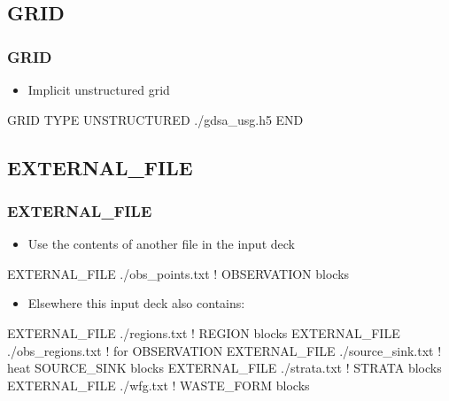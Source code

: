 \documentclass{beamer}
\newcommand\redcomment[1]{{{\color{red} #1}}}
\newcommand\bluecomment[1]{{{\color{blue} #1}}}
\begin{document}
\subsection{GRID}

\begin{frame}[fragile]\frametitle{GRID}

\begin{itemize}
  \item Implicit \redcomment{unstructured} grid 
\end{itemize}

\begin{semiverbatim}
GRID
  TYPE UNSTRUCTURED ./gdsa_usg.h5
END
\end{semiverbatim}

\end{frame}

\subsection{EXTERNAL\_FILE}

\begin{frame}[fragile]\frametitle{EXTERNAL\_FILE}
\begin{itemize}
  \item Use the contents of another file in the input deck
\end{itemize}

\begin{semiverbatim}
EXTERNAL_FILE ./obs_points.txt \bluecomment{! OBSERVATION blocks}
\end{semiverbatim}

\begin{itemize}
  \item Elsewhere this input deck also contains:
\end{itemize}

\begin{semiverbatim}
EXTERNAL_FILE ./regions.txt \bluecomment{! REGION blocks}
EXTERNAL_FILE ./obs_regions.txt \bluecomment{! for OBSERVATION} 
EXTERNAL_FILE ./source_sink.txt \bluecomment{! heat SOURCE_SINK blocks}
EXTERNAL_FILE ./strata.txt \bluecomment{! STRATA blocks}
EXTERNAL_FILE ./wfg.txt \bluecomment{! WASTE_FORM blocks}
\end{semiverbatim}

\end{frame}
\end{document}
